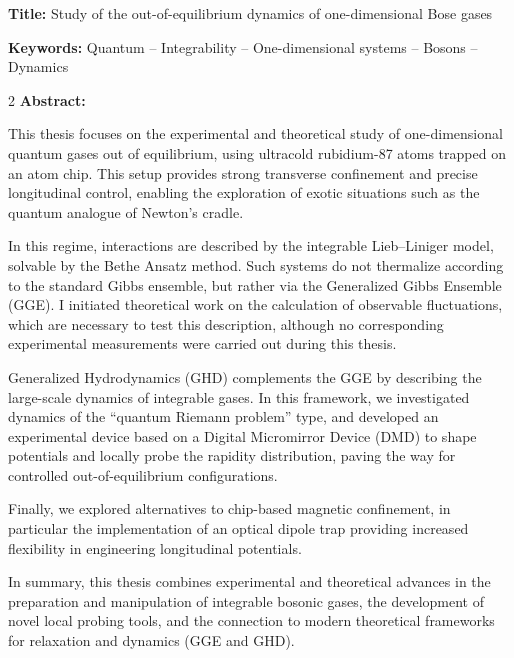 \documentclass[french,12pt,a4paper]{book}
\begin{document}
\vspace{8mm}

\begin{mdframed}[linecolor=Prune,linewidth=1]

\textbf{Title:} Study of the out-of-equilibrium dynamics of one-dimensional Bose gases

\noindent \textbf{Keywords:} Quantum – Integrability – One-dimensional systems – Bosons – Dynamics

\begin{multicols}{2}
\noindent \textbf{Abstract:}  {\fontsize{11pt}{6pt}\selectfont 
This thesis focuses on the experimental and theoretical study of one-dimensional quantum gases out of equilibrium, using ultracold rubidium-87 atoms trapped on an atom chip. This setup provides strong transverse confinement and precise longitudinal control, enabling the exploration of exotic situations such as the quantum analogue of Newton’s cradle.

\medskip

In this regime, interactions are described by the integrable Lieb–Liniger model, solvable by the Bethe Ansatz method. Such systems do not thermalize according to the standard Gibbs ensemble, but rather via the Generalized Gibbs Ensemble (GGE). I initiated theoretical work on the calculation of observable fluctuations, which are necessary to test this description, although no corresponding experimental measurements were carried out during this thesis.

\medskip

Generalized Hydrodynamics (GHD) complements the GGE by describing the large-scale dynamics of integrable gases. In this framework, we investigated dynamics of the “quantum Riemann problem” type, and developed an experimental device based on a Digital Micromirror Device (DMD) to shape potentials and locally probe the rapidity distribution, paving the way for controlled out-of-equilibrium configurations.

\medskip

Finally, we explored alternatives to chip-based magnetic confinement, in particular the implementation of an optical dipole trap providing increased flexibility in engineering longitudinal potentials.

\medskip

In summary, this thesis combines experimental and theoretical advances in the preparation and manipulation of integrable bosonic gases, the development of novel local probing tools, and the connection to modern theoretical frameworks for relaxation and dynamics (GGE and GHD).

}
\end{multicols}
\end{mdframed}
\end{document}
